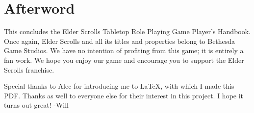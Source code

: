 \chapter*{Afterword}
This concludes the Elder Scrolls Tabletop Role Playing Game Player's Handbook. Once again, Elder Scrolls and all its titles and properties belong to Bethesda Game Studios. We have no intention of profiting from this game; it is entirely a fan work. We hope you enjoy our game and encourage you to support the Elder Scrolls franchise.

Special thanks to Alec for introducing me to LaTeX, with which I made this PDF. Thanks as well to everyone else for their interest in this project. I hope it turns out great! -Will